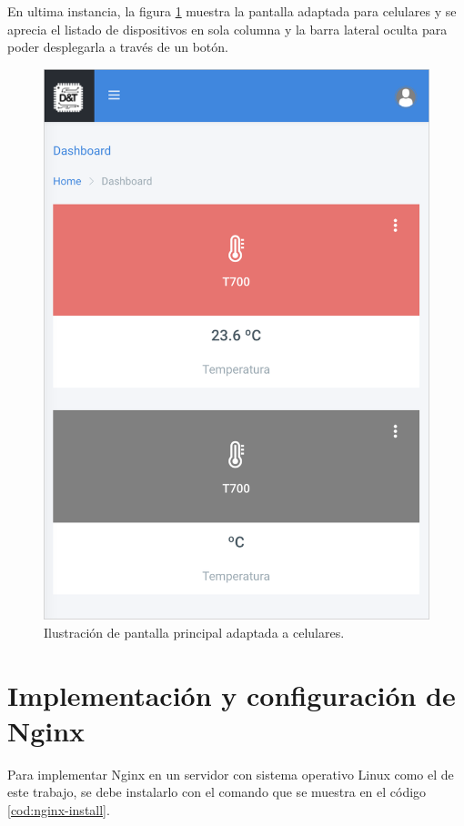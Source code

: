 \pagebreak
En ultima instancia, la figura \ref{fig:pantalla-celu} muestra la pantalla adaptada para celulares y se aprecia el listado de dispositivos en sola columna y la barra lateral oculta para poder desplegarla a través de un botón.

\begin{figure}[htpb]
	\centering
	\includegraphics[scale=.60]{./Figures/pantalla-celu.png}
	\caption[Pantalla adaptada a celulares]{Ilustración de pantalla principal adaptada a celulares.}
	\label{fig:pantalla-celu}
\end{figure}

\newpage
\section{Implementación y configuración de Nginx}

Para implementar Nginx en un servidor con sistema operativo Linux como el de este trabajo,  se debe instalarlo con el comando que se muestra en el código \ref{cod:nginx-install}. 

